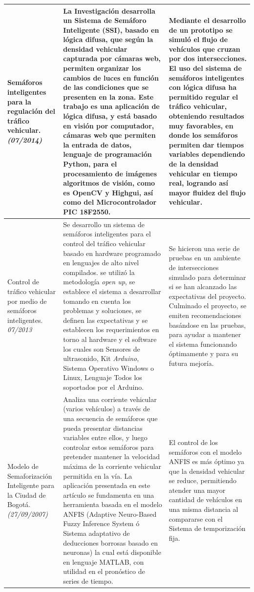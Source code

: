 \begin{center}
\begin{longtable}{|p{2.7cm}|p{7cm}|p{5.0cm}|}
		Semáforos inteligentes para la regulación del tráfico vehicular.\cite{bencesramos} \emph{(07/2014)}&
		La Investigación desarrolla un Sistema de Semáforo Inteligente (SSI), basado en lógica difusa, que según la densidad vehicular capturada por cámaras web, permiten organizar los cambios de luces en función de las condiciones que se presenten en la zona.
		Este trabajo es una aplicación de lógica difusa, y está basado en visión por computador, cámaras web que permiten la entrada de datos, lenguaje de programación Python, para el procesamiento de imágenes algoritmos de visión, como es OpenCV y Highgui, así como del Microcontrolador PIC 18F2550.&
		Mediante el desarrollo de un prototipo se simuló el flujo de vehículos que cruzan por dos intersecciones. El uso del sistema de semáforos inteligentes con lógica difusa ha permitido regular el tráfico vehicular, obteniendo resultados muy favorables, en donde los semáforos permiten dar tiempos variables dependiendo de la densidad vehicular en tiempo real, logrando así mayor fluidez del flujo vehicular.\\ \hline
		
		
		Control de tráfico vehicular por medio de semáforos inteligentes.\cite{MoraleslGonzales} \emph{07/2013}&
		Se desarrollo un sistema de semáforos inteligentes para el control del tráfico vehicular basado en hardware programado en lenguajes de alto nivel compilados. se utilizó la metodología \textit{open up}, se establece el sistema a desarrollar tomando en cuenta los problemas y soluciones, se definen las expectativas y se establecen los requerimientos en torno al hardware y el software los cuales son Sensores de ultrasonido, Kit \textit{Arduino}, Sistema Operativo 
		Windows o Linux, Lenguaje Todos los soportados por el Arduino.&
		Se hicieron una serie de pruebas en un ambiente de intersecciones simulado para determinar si se han alcanzado las expectativas del proyecto. Culminado el proyecto, se emiten recomendaciones basándose en las pruebas, para ayudar a mantener el sistema funcionando óptimamente y para su futura mejoría.\\ \hline
		
		Modelo de Semaforización Inteligente para la Ciudad de Bogotá. \cite{Hernandezca} \newline \emph{(27/09/2007)}&
		Analiza una corriente vehicular (varios vehículos) a través de una secuencia de semáforos que pueda presentar distancias variables entre ellos, y luego controlar estos semáforos para pretender mantener la velocidad máxima de la corriente vehicular permitida en la vía.  La aplicación presentada en este artículo se fundamenta en una herramienta basada en el modelo ANFIS (Adaptive Neuro-Based Fuzzy Inference System ó Sistema adaptativo de deducciones borrosas basado en neuronas) la cual está disponible en lenguaje MATLAB, con utilidad en el pronóstico de series de tiempo.&
		El control de los semáforos con el modelo ANFIS es más óptimo ya que la densidad vehicular se  reduce, permitiendo
		atender una mayor cantidad de vehículos en una misma distancia al compararse con el 
		Sistema de temporización fija.\\ \hline
		

\end{longtable}
\end{center}
